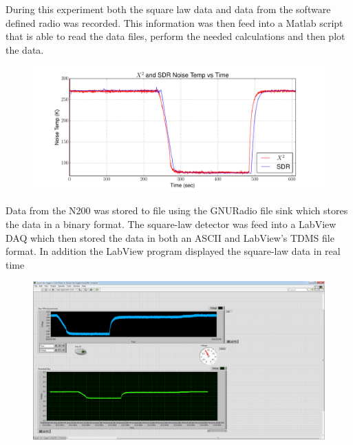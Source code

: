 During this experiment both the square law data and data from the software defined radio was recorded.  This information was then feed into a Matlab script that is able to read the data files, perform the needed calculations and then plot the data.  

\begin{figure}[h!tb] \centering

\includegraphics[width=\textwidth]{Experiments/Exp1/x2_SDR_Calibrated.pdf}

\label{lab1_x2_n200}
\end{figure}

Data from the N200 was stored to file using the GNURadio file sink which stores the data in a binary format.  The square-law detector was feed into a LabView DAQ which then stored the data in both an ASCII and LabView's TDMS file format.  In addition the LabView program displayed the square-law data in real time

\begin{figure}[h!tb] \centering

\includegraphics[width=\textwidth]{Images/labviewx2_lab0.png}

\label{labview_tpr}
\end{figure}

